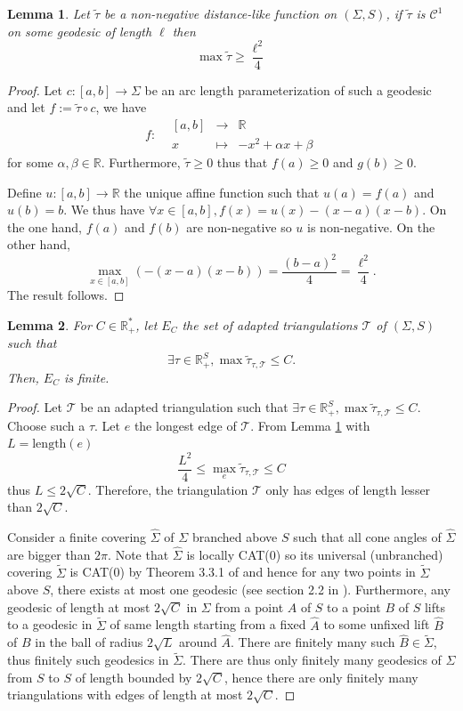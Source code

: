 \documentclass[a4paper,12pt]{article}
\def\TT{\mathcal T}
\def\RR{\mathbb{R}}
\newcommand{\function}[5]{\displaystyle#1:\begin{array}{l|rcl}
& \displaystyle #2 & \longrightarrow & \displaystyle #3 \\
	& \displaystyle #4 & \longmapsto & \displaystyle #5 \end{array}}
\newcommand{\tautilde}[2]{\widetilde\tau_{#1,#2}}
\newtheorem{lem}{Lemma}[section]		 %
\theoremstyle{definition}
\begin{document}
						\begin{lem}\label{lem:max_quad}
						Let $\widetilde\tau$ be a non-negative distance-like function on $(\Sigma, S)$, if $\widetilde\tau$ is $\mathscr C^1$ on some geodesic of length $\ell$ then $$\max\widetilde\tau \geq \frac{\ell^2}{4}$$
					
						\end{lem}

						\begin{proof}
						
						
						Let $c:[a,b]\rightarrow \Sigma$ be an arc length parameterization of such a geodesic and let $f:=\widetilde\tau\circ c$, we have $$\function{f}{[a,b]}{\RR}{x}{-x^2+\alpha x+ \beta}$$
						for some $\alpha,\beta\in \RR$. 
						Furthermore, $\widetilde\tau\geq 0$ thus that $f(a)\geq 0$ and $g(b)\geq 0$.
					
						 Define $u:[a,b]\rightarrow \RR$ the unique affine function such that $u(a)=f(a)$ and $u(b)=b$. We thus have $\forall x\in [a,b], f(x)=u(x)-(x-a)(x-b)$. 
						 On the one hand, $f(a)$ and $f(b)$ are non-negative so $u$ is non-negative.
						 On the other hand, $$\max_{x\in[a,b]}(-(x-a)(x-b))=\frac{(b-a)^2}{4}=\frac{\ell^2}{4}.$$ The result follows.
						 \end{proof}
						\begin{lem} \label{lem:triangulation_finie}
						For $C\in \RR_+^*$, let $E_C$ the set of adapted triangulations $\TT$ of $(\Sigma, S)$ such that $$\exists \tau\in \RR_+^S,\max\tautilde{\tau}{\TT}\leq C.$$
						Then, $E_C$ is finite.
						\end{lem}
						\begin{proof}
						 Let $\TT$ be an adapted triangulation such that $\exists \tau\in \RR_+^S,\max\tautilde{\tau}{\TT}\leq C$. Choose such a $\tau$. 
						 Let $e$ the longest edge of $\TT$. 
						 From Lemma \ref{lem:max_quad} with $L=\mathrm{length}(e)$
						 $$ \frac{L^2}{4} \leq\max_{e}\tautilde{\tau}{\TT} \leq C $$
						 thus $L\leq 2\sqrt{C}$. Therefore, the triangulation $\TT$ only has edges of length lesser than $2\sqrt{C}$.
						 
						 Consider a finite covering $\widehat\Sigma$ of $\Sigma$ branched above $S$ such that all cone angles of $\widehat\Sigma$ are bigger than $2\pi$. Note that $\widehat \Sigma$ is locally CAT(0) so 
						 its universal (unbranched) covering $\widetilde{\Sigma}$ is CAT(0) by Theorem 3.3.1 of \cite{alexander2019invitation} and hence for any two points in $\widetilde \Sigma$ above $S$, there exists at most one geodesic (see section  2.2 in \cite{alexander2019invitation}). 
						 Furthermore, any geodesic of length at most $2\sqrt{C}$ in $\Sigma$ from a point $A$ of $S$ to a point $B$ of $S$ lifts to a geodesic 
						 in $\widetilde \Sigma$ of same length  starting from a fixed $\hat A$ to some unfixed lift $\hat B$ of $B$ in the ball of radius $2\sqrt L$ around $\hat A$.
						 There are finitely many such $\hat B\in\widetilde \Sigma$, thus finitely such geodesics in $\widetilde \Sigma$. 
						 There are thus only finitely many geodesics of $\Sigma$ from $S$ to $S$ of length bounded by $2\sqrt{C}$, hence there are only finitely many triangulations with edges of length at most $2\sqrt{C}$. 
						\end{proof}
\end{document}
